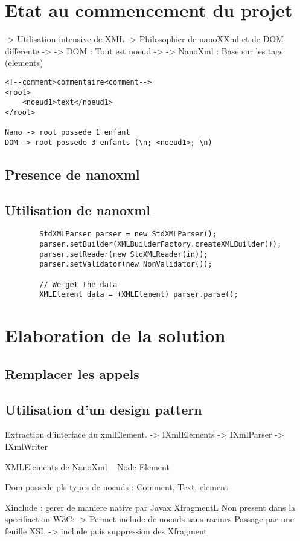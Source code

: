 \section{Etat au commencement du projet}
-> Utilisation intensive de XML
-> Philosophier de nanoXXml et de DOM differente
-> -> DOM : Tout est noeud
-> -> NanoXml : Base sur les tags (elements)
\begin{verbatim}
<!--comment>commentaire<comment-->
<root>
	<noeud1>text</noeud1>
</root>

Nano -> root possede 1 enfant
DOM -> root possede 3 enfants (\n; <noeud1>; \n)
\end{verbatim}
\subsection{Presence de nanoxml}
\subsection{Utilisation de nanoxml}
\begin{verbatim}
        StdXMLParser parser = new StdXMLParser();
        parser.setBuilder(XMLBuilderFactory.createXMLBuilder());
        parser.setReader(new StdXMLReader(in));
        parser.setValidator(new NonValidator());

        // We get the data
        XMLElement data = (XMLElement) parser.parse();
\end{verbatim}

\section{Elaboration de la solution}
\subsection{Remplacer les appels}
\subsection{Utilisation d'un design pattern}
Extraction d'interface du xmlElement.
-> IXmlElements
-> IXmlParser
-> IXmlWriter

XMLElements de NanoXml ~ Node Element

Dom possede pls types de noeuds : Comment, Text, element

Xinclude : gerer de maniere native par Javax
XfragmentL Non present dans la specifiaction W3C:
-> Permet include de noeuds sans racines
Passage par une feuille XSL
-> include puis suppression des Xfragment
